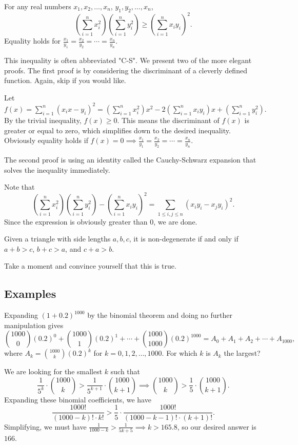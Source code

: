 \documentclass{article}
\begin{document}
\begin{theo} 
For any real numbers $x_1,x_2,\ldots,x_n$, $y_1,y_2,\ldots,x_n$,  \[\left(\sum_{i=1}^n x_i^2\right)\left(\sum_{i=1}^n y_i^2\right)\ge\left(\sum_{i=1}^n x_iy_i\right)^2.\] Equality holds for $\frac{x_1}{y_1}=\frac{x_2}{y_2}=\cdots=\frac{x_n}{y_n}$. 
\end{theo}
This inequality is often abbreviated "C-S". We present two of the more elegant proofs. The first proof is by considering the discriminant of a cleverly defined function. Again, skip if you would like.
\begin{pro}
Let $f(x)=\sum_{i=1}^n (x_ix-y_i)^2=\left(\sum_{i=1}^n x_i^2\right)x^2-2\left(\sum_{i=1}^n x_iy_i\right)x+\left(\sum_{i=1}^n y_i^2\right). $ By the trivial inequality, $f(x)\ge 0$. This means the discriminant of $f(x)$ is greater or equal to zero, which simplifies down to the desired inequality. Obviously equality holds if $f(x)=0\implies \frac{x_1}{y_1}=\frac{x_2}{y_2}=\cdots=\frac{x_n}{y_n}$. 
\end{pro}

The second proof is using an identity called the Cauchy-Schwarz expansion that solves the inequality immediately. 
\begin{pro}
Note that
\[\left(\sum_{i=1}^n x_i^2\right)\left(\sum_{i=1}^ny_i^2\right)-\left(\sum_{i=1}^n x_iy_i\right)^2=\sum_{1\leq i,j\leq n}(x_iy_i-x_jy_i)^2.\] Since the expression is obviously greater than $0$, we are done.
\end{pro}

\begin{theo} 
Given a triangle with side lengths $a,b,c$, it is non-degenerate if and only if $a+b>c$, $b+c>a$, and $c+a>b.$
\end{theo}
Take a moment and convince yourself that this is true. 
\subsection{Examples}

\begin{exam}[AIME 1991/3]
Expanding $(1+0.2)^{1000}$ by the binomial theorem and doing no further manipulation gives
\[\binom{1000}0(0.2)^0+\binom{1000}1(0.2)^1+\cdots+\binom{1000}{1000}(0.2)^{1000}= A_0 + A_1 + A_2 + \cdots + A_{1000},\]
where $A_k = \binom{1000}k(0.2)^k$ for $k = 0,1,2,\ldots,1000$. For which $k$ is $A_k$ the largest?
\end{exam}
\begin{sol}
We are looking for the smallest $k$ such that \[\frac1{5^k}\cdot\binom{1000}k>\frac1{5^{k+1}}\cdot \binom{1000}{k+1}\implies \binom{1000}k>\frac15\cdot \binom{1000}{k+1}.\] Expanding these binomial coefficients, we have \[\frac{1000!}{(1000-k)!\cdot k!}>\frac15\cdot\frac{1000!}{(1000-k-1)!\cdot (k+1)!}. \] Simplifying, we must have $\frac1{1000-k}>\frac1{5k+5}\implies k>165.8$, so our desired answer is $166$. 
\end{sol}
\end{document}
